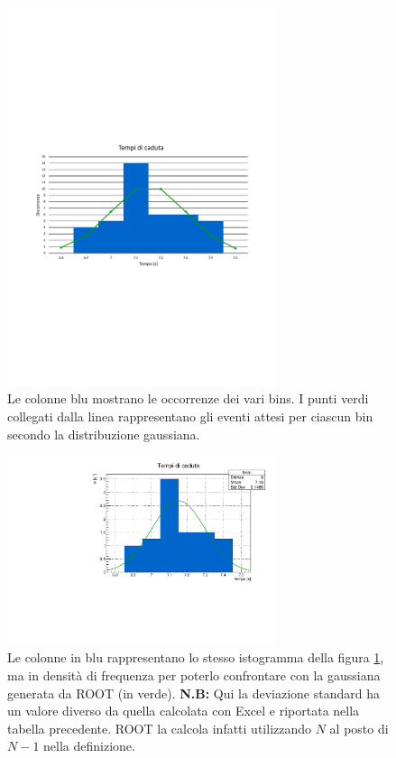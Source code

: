 \documentclass{article}
\begin{document}
\begin{figure}[h!]
\centering
\includegraphics[width=0.7\textwidth]{excel}
\caption{Le colonne blu mostrano le occorrenze dei vari bins. I punti verdi collegati dalla linea rappresentano gli eventi attesi per ciascun bin secondo la distribuzione gaussiana.}
\label{figure:tempi_excel}
\end{figure}

\begin{figure}[h!]
\centering
\includegraphics[width=0.7\textwidth]{root}
\caption{Le colonne in blu rappresentano lo stesso istogramma della figura \ref{figure:tempi_excel}, ma in densità di frequenza per poterlo confrontare con la gaussiana generata da ROOT (in verde). \textbf{N.B:} Qui la deviazione standard ha un valore diverso da quella calcolata con Excel e riportata nella tabella precedente. ROOT la calcola infatti utilizzando $N$ al posto di $N-1$ nella definizione.}
\label{figure:tempi_root}
\end{figure}
\end{document}
